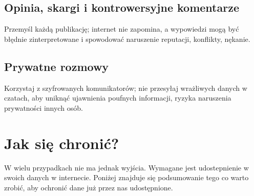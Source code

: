 \subsection{Opinia, skargi i kontrowersyjne komentarze}
Przemyśl każdą publikację; internet nie zapomina, a wypowiedzi mogą być błędnie zinterpretowane i spowodować  naruszenie reputacji, konflikty, nękanie.

\subsection{Prywatne rozmowy}
Korzystaj z szyfrowanych komunikatorów; nie przesyłaj wrażliwych danych w czatach, aby uniknąć ujawnienia poufnych informacji, ryzyka naruszenia prywatności innych osób.

\section{Jak się chronić?}
W wielu przypadkach nie ma jednak wyjścia. Wymagane jest udostepnienie w swoich danych w internecie. Poniżej znajduje się podsumowanie tego co warto zrobić, aby ochronić dane już przez nas udostępnione.

